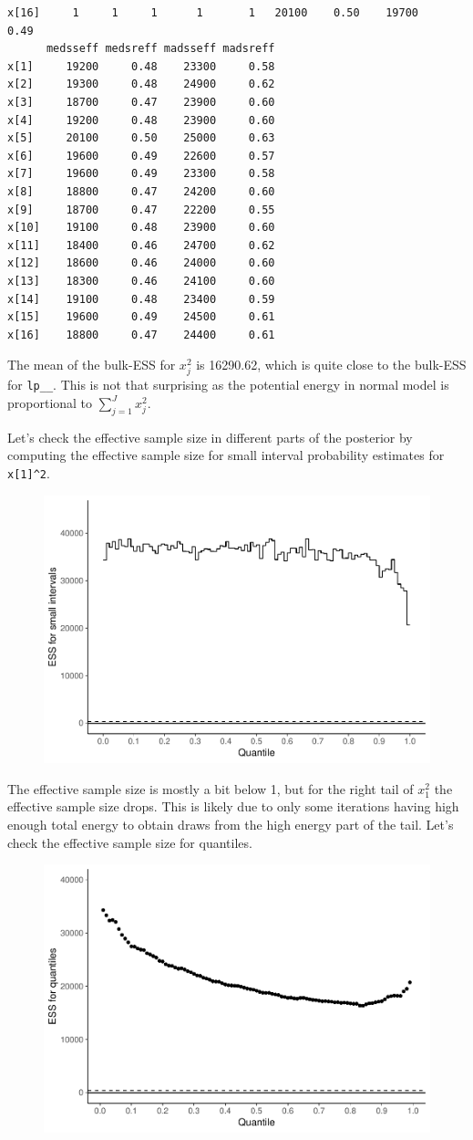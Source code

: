 \documentclass[american,]{article}
\begin{document}
\begin{verbatim}
x[16]     1     1     1      1       1   20100    0.50    19700     0.49
      medsseff medsreff madsseff madsreff
x[1]     19200     0.48    23300     0.58
x[2]     19300     0.48    24900     0.62
x[3]     18700     0.47    23900     0.60
x[4]     19200     0.48    23900     0.60
x[5]     20100     0.50    25000     0.63
x[6]     19600     0.49    22600     0.57
x[7]     19600     0.49    23300     0.58
x[8]     18800     0.47    24200     0.60
x[9]     18700     0.47    22200     0.55
x[10]    19100     0.48    23900     0.60
x[11]    18400     0.46    24700     0.62
x[12]    18600     0.46    24000     0.60
x[13]    18300     0.46    24100     0.60
x[14]    19100     0.48    23400     0.59
x[15]    19600     0.49    24500     0.61
x[16]    18800     0.47    24400     0.61
\end{verbatim}

The mean of the bulk-ESS for \(x_j^2\) is 16290.62, which is quite close
to the bulk-ESS for \texttt{lp\_\_}. This is not that surprising as the
potential energy in normal model is proportional to
\(\sum_{j=1}^J x_j^2\).

Let's check the effective sample size in different parts of the
posterior by computing the effective sample size for small interval
probability estimates for \texttt{x{[}1{]}\^{}2}.

\begin{figure}[t]
  \centering
  \includegraphics[width=0.6\linewidth]{graphics/local-ess-fit-n-2-1.pdf}
\end{figure}

The effective sample size is mostly a bit below 1, but for the right
tail of \(x_1^2\) the effective sample size drops. This is likely due to
only some iterations having high enough total energy to obtain draws
from the high energy part of the tail. Let's check the effective sample
size for quantiles.

\begin{figure}[t]
  \centering
  \includegraphics[width=0.6\linewidth]{graphics/quantile-ess-fit-n-2-1.pdf}
\end{figure}
\end{document}

